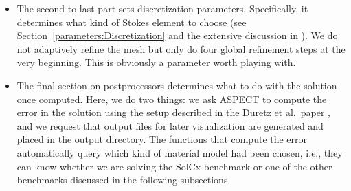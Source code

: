\documentclass{article}
\newcommand{\aspect}{\textsc{ASPECT}}
\begin{document}
\begin{itemize}
\item The second-to-last part sets discretization parameters. Specifically, it
  determines what kind of Stokes element to choose (see
  Section~\ref{parameters:Discretization} and the extensive discussion in
  \cite{KHB12}). We do not adaptively refine the mesh but only do four global
  refinement steps at the very beginning. This is obviously a parameter worth
  playing with.

\item The final section on postprocessors determines what to do with the
  solution once computed. Here, we do two things: we ask \aspect{} to compute
  the error in the solution using the setup described in the Duretz et
  al.~paper \cite{DMGT11}, and we request that output files for later
  visualization are generated and placed in the output directory. The
  functions that compute the error automatically query which kind of material
  model had been chosen, i.e., they can know whether we are solving the SolCx
  benchmark or one of the other benchmarks discussed in the following
  subsections.
\end{itemize}
\end{document}
